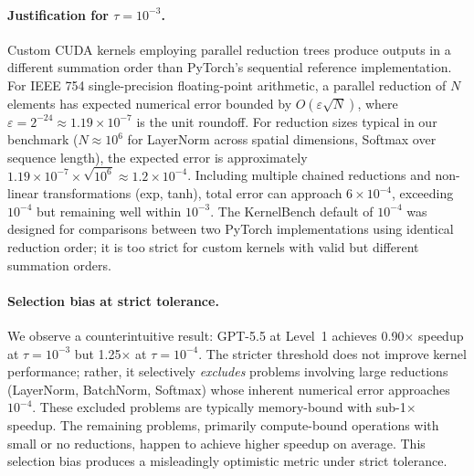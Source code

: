 \documentclass[11pt]{article}
\begin{document}

\paragraph{Justification for $\tau = 10^{-3}$.}
Custom CUDA kernels employing parallel reduction trees produce outputs in a different summation order than PyTorch's sequential reference implementation. For IEEE 754 single-precision floating-point arithmetic, a parallel reduction of $N$ elements has expected numerical error bounded by $O(\varepsilon\sqrt{N})$, where $\varepsilon = 2^{-24} \approx 1.19 \times 10^{-7}$ is the unit roundoff. For reduction sizes typical in our benchmark ($N \approx 10^6$ for LayerNorm across spatial dimensions, Softmax over sequence length), the expected error is approximately $1.19 \times 10^{-7} \times \sqrt{10^6} \approx 1.2 \times 10^{-4}$. Including multiple chained reductions and non-linear transformations (exp, tanh), total error can approach $6 \times 10^{-4}$, exceeding $10^{-4}$ but remaining well within $10^{-3}$. The KernelBench default of $10^{-4}$ was designed for comparisons between two PyTorch implementations using identical reduction order; it is too strict for custom kernels with valid but different summation orders.

\paragraph{Selection bias at strict tolerance.}
We observe a counterintuitive result: GPT-5.5 at Level~1 achieves 0.90$\times$ speedup at $\tau = 10^{-3}$ but 1.25$\times$ at $\tau = 10^{-4}$. The stricter threshold does not improve kernel performance; rather, it selectively \emph{excludes} problems involving large reductions (LayerNorm, BatchNorm, Softmax) whose inherent numerical error approaches $10^{-4}$. These excluded problems are typically memory-bound with sub-1$\times$ speedup. The remaining problems, primarily compute-bound operations with small or no reductions, happen to achieve higher speedup on average. This selection bias produces a misleadingly optimistic metric under strict tolerance.
\end{document}
